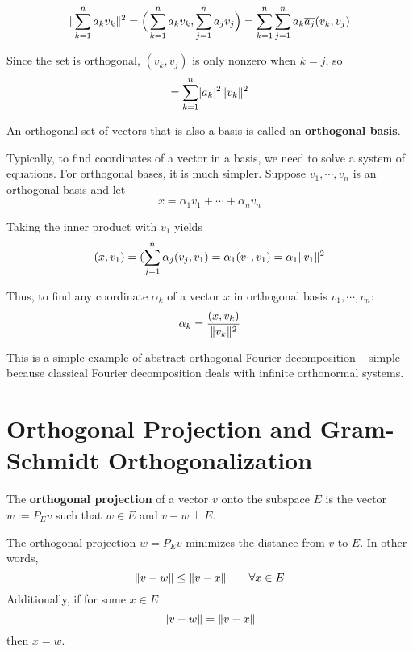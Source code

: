 \begin{lproof}
$$\lVert\sum_{k=1}^{n} a_{k} v_{k}\rVert^{2} = \Big( \sum_{k=1}^{n} a_{k} v_{k}, \sum_{j=1}^{n} a_{j} v_{j} \Big) = \sum_{k=1}^{n} \sum_{j=1}^{n} a_{k} \overline{a_{j}} (v_{k}, v_{j})$$

Since the set is orthogonal, $(v_{k}, v_{j})$ is only nonzero when $k = j$, so 
$$= \sum_{k=1}^{n} \lvert a_{k}\rvert^{2} \lVert v_{k}\rVert^{2}$$
\end{lproof}

\begin{definition}
An orthogonal set of vectors that is also a basis is called an \textbf{orthogonal basis}. 
\end{definition}

Typically, to find coordinates of a vector in a basis, we need to solve a system of equations. For orthogonal bases, it is much simpler. Suppose $v_{1}, \cdots, v_{n}$ is an orthogonal basis and let 
$$x = \alpha_{1} v_{1} + \cdots + \alpha_{n} v_{n}$$

Taking the inner product with $v_{1}$ yields 
$$(x, v_{1}) = (\sum_{j=1}^{n} \alpha_{j} (v_{j}, v_{1}) = \alpha_{1} (v_{1}, v_{1}) = \alpha_{1} \lVert v_{1}\rVert^{2}$$

Thus, to find any coordinate $\alpha_{k}$ of a vector $x$ in orthogonal basis $v_{1}, \cdots, v_{n}$: 
$$ \alpha_{k} = \frac{(x, v_{k})}{\lVert v_{k}\rVert^{2}}$$

This is a simple example of abstract orthogonal Fourier decomposition -- simple because classical Fourier decomposition deals with infinite orthonormal systems. 

\section{Orthogonal Projection and Gram-Schmidt Orthogonalization} 

\begin{definition}
The \textbf{orthogonal projection} of a vector $v$ onto the subspace $E$ is the vector $w := P_{E} v$ such that $w \in E$ and $v - w \perp E$. 
\end{definition}

\begin{theorem}
The orthogonal projection $w = P_{E} v$ minimizes the distance from $v$ to $E$. In other words, 
$$\lVert v - w\rVert \leq \lVert v - x\rVert \qquad \forall x \in E$$
Additionally, if for some $x \in E$
$$\lVert v - w\rVert = \lVert v - x\rVert$$
then $x = w$. 
\end{theorem}

